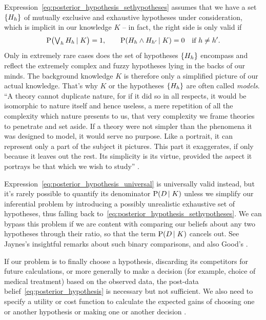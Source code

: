 \documentclass[\ifafour a4paper,12pt,\else a5paper,10pt,\fi%
onecolumn,oneside,article,%
british%
]{memoir}
\theoremstyle{remark}
\theoremstyle{innote}
\newcommand*{\citep}{\parencites}
\newcommand*{\citey}{\parencites*}
\DeclarePairedDelimiter\set{\{}{\}}
\newcommand*{\p}{\mathrm{P}}%
\renewcommand*{\|}[1][]{\nonscript\,#1\vert\nonscript\;\mathopen{}}
\newcommand*{\sect}{\S}%
\newcommand*{\sects}{\S\S}%
\newcommand*{\chap}{ch.}%
\newcommand*{\tlor}{\mathop{\textstyle\bigvee}\nolimits}
\newcommand*{\yK}{K}
\begin{document}
Expression~\eqref{eq:posterior_hypothesis_sethypotheses} assumes that
we have a set $\set{H_{h}}$ of mutually exclusive and exhaustive hypotheses
under consideration, which is implicit in our knowledge $\yK$ -- in fact,
the right side is only valid if
\begin{equation}
  \label{eq:implicit_knowledge}
  \p\bigl(\tlor_{h} H_{h} \| \yK\bigr) = 1,
  \qquad
  \p(H_{h} \land H_{h'} \| \yK) = 0 \quad \text{if $h \ne h'$}.
\end{equation}
Only in extremely rare cases does the set of hypotheses $\set{H_{h}}$
encompass and reflect the extremely complex and fuzzy hypotheses lying
in the backs of our minds. The background knowledge $\yK$ is therefore only
a simplified picture of our actual knowledge. That's why $\yK$ or the
hypotheses $\set{H_{h}}$ are often called \emph{models}.\; \enquote{A
  theory cannot duplicate nature, for if it did so in all respects, it
  would be isomorphic to nature itself and hence useless, a mere repetition
  of all the complexity which nature presents to us, that very complexity
  we frame theories to penetrate and set aside. If a theory were not
  simpler than the phenomena it was designed to model, it would serve no
  purpose. Like a portrait, it can represent only a part of the subject it
  pictures. This part it exaggerates, if only because it leaves out the
  rest. Its simplicity is its virtue, provided the aspect it portrays be
  that which we wish to study} \citep[Prologue p.~xvi]{truesdelletal1980}.

Expression~\eqref{eq:posterior_hypothesis_universal} is universally valid
instead, but it's rarely possible to quantify its denominator
$\p(D \| \yK)$ unless we simplify our inferential problem by introducing a
possibly unrealistic exhaustive set of hypotheses, thus falling back
to~\eqref{eq:posterior_hypothesis_sethypotheses}. We can bypass this
problem if we are content with comparing our beliefs about any two
hypotheses through their ratio, so that the term $\p(D \| \yK)$ cancels
out. See Jaynes's \citey[\sects~4.3--4.4]{jaynes1994_r2003} insightful
remarks about such binary comparisons, and also Good's
\citey[\sect~6.3--6.6]{good1950}.


\bigskip

If our problem is to finally choose a hypothesis, discarding its
competitors for future calculations, or more generally to make a decision
(for example, choice of medical treatment) based on the observed data, the
post-data belief~\eqref{eq:posterior_hypothesis} is necessary but not
sufficient. We also need to specify a utility or cost function to calculate
the expected gains of choosing one or another hypothesis or making one or
another decision
\citep{kadaneetal1980b,degroot1970_r2004}[\chap~2]{bernardoetal1994_r2000}.
\end{document}
